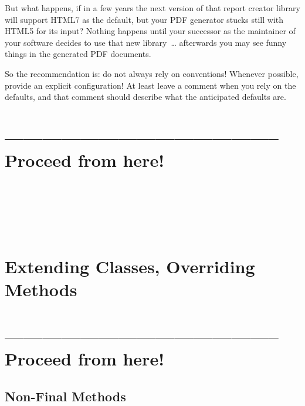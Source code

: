 \documentclass[11pt,a4paper, titlepage, parskip=half, headsepline, footsepline, cleardoublepage=current, headheight=1cm]{scrbook}
\begin{document}
But what happens, if in a few years the next version of that report creator library will support HTML7 as the default, but your PDF generator stucks still with HTML5 for its input? Nothing happens until your successor as the maintainer of your software decides to use that new library~… afterwards you may see funny things in the generated PDF documents.

So the recommendation is: do not always rely on conventions! Whenever possible, provide an explicit configuration! At least leave a comment when you rely on the defaults, and that comment should describe what the anticipated defaults are.

\section{-------------------------------------------- Proceed from here!}

\begin{lstlisting}
\end{lstlisting}

\begin{lstlisting}
\end{lstlisting}

\begin{lstlisting}
\end{lstlisting}

\begin{lstlisting}
\end{lstlisting}

\begin{lstlisting}
\end{lstlisting}

\begin{lstlisting}
\end{lstlisting}

\begin{lstlisting}
\end{lstlisting}

\section{Extending Classes, Overriding Methods}\label{sec:ExtendingClassesOverridingMethods}
\section{-------------------------------------------- Proceed from here!}
\lipsum[1]

\subsection{Non-Final Methods}\label{sec:NonFinalMethods}
\lipsum[1]
\end{document}
